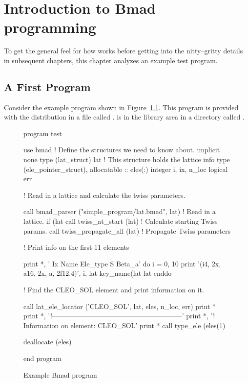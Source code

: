 \chapter{Introduction to Bmad programming}
\label{c:program.info}

To get the general feel for how \bmad works before
getting into the nitty--gritty details in subsequent chapters, this
chapter analyzes an example test program.

\section{A First Program}

Consider the example program shown in Figure~\ref{f:program}.
This program is provided with the \bmad distribution in a file called
.  is in the 
library area in a directory called .

\begin{figure}[htp]
\begin{listing}{1}
program test

  use bmad                 ! Define the structures we need to know about.
  implicit none
  type (lat_struct) lat   ! This structure holds the lattice info
  type (ele_pointer_struct), allocatable :: eles(:)
  integer i, ix, n_loc
  logical err

  ! Read in a lattice and calculate the twiss parameters.

  call bmad_parser ("simple_program/lat.bmad", lat) ! Read in a lattice.
  if (lat%
           call twiss_at_start (lat)  ! Calculate starting Twiss params.
  call twiss_propagate_all (lat)      ! Propagate Twiss parameters

  ! Print info on the first 11 elements

  print *, ' Ix  Name              Ele_type                   S      Beta_a'
  do i = 0, 10
    print '(i4, 2x, a16, 2x, a, 2f12.4)', i, lat%
                    key_name(lat%
                    lat%
  enddo

  ! Find the CLEO_SOL element and print information on it.

  call lat_ele_locator ('CLEO_SOL', lat, eles, n_loc, err)
  print *
  print *, '!---------------------------------------------------------'
  print *, '! Information on element: CLEO_SOL'
  print *
  call type_ele (eles(1)%

  deallocate (eles)

end program
\end{listing}
\caption{Example Bmad program}
\label{f:program}
\end{figure}


